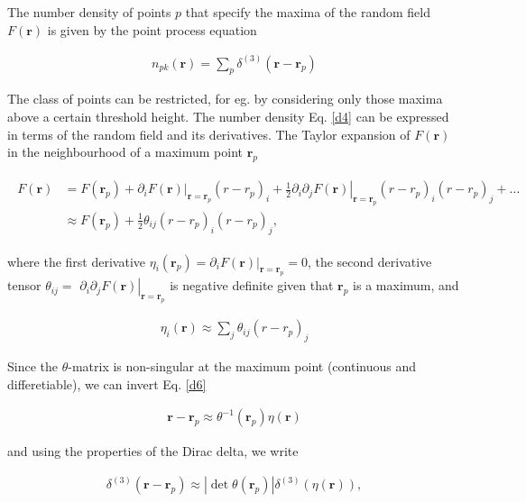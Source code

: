 \begin{appendices}
The number density of points $p$ that specify the maxima of the random field $F(\mathbf{r})$ is given by the point process equation

\begin{align}
    n_{p k}(\mathbf{r})=\sum_{p} \delta^{(3)}\left(\mathbf{r}-\mathbf{r}_{p}\right) \label{d4}
\end{align}

The class of points can be restricted, for eg. by considering only those maxima above a certain threshold height. The number density Eq. \ref{d4} can be expressed in terms of the random field and its derivatives. The Taylor expansion of $F(\mathbf{r})$ in the neighbourhood of a maximum point $\mathbf{r}_{p}$

\begin{align}\begin{split}
    F(\mathbf{r}) & =F\left(\mathbf{r}_{p}\right)+\left.\partial_{i} F(\mathbf{r})\right|_{\mathbf{r}=\mathbf{r}_{p}}\left(r-r_{p}\right)_{i}+\left.\frac{1}{2} \partial_{i} \partial_{j} F(\mathbf{r})\right|_{\mathbf{r}=\mathbf{r}_{p}}\left(r-r_{p}\right)_{i}\left(r-r_{p}\right)_{j}+\ldots \\
    & \approx F\left(\mathbf{r}_{p}\right)+\frac{1}{2} \theta_{i j}\left(r-r_{p}\right)_{i}\left(r-r_{p}\right)_{j},\end{split}\label{d5}
\end{align}

where the first derivative $\eta_{i}\left(\mathbf{r}_{p}\right)=\left.\partial_{i} F(\mathbf{r})\right|_{\mathbf{r}=\mathbf{r}_{p}}=0$, the second derivative tensor $\theta_{i j}=$ $\left.\partial_{i} \partial_{j} F(\mathbf{r})\right|_{\mathbf{r}=\mathbf{r}_{p}}$ is negative definite given that $\mathbf{r}_{p}$ is a maximum, and

\begin{align}
    \eta_{i}(\mathbf{r}) \approx \sum_{j} \theta_{i j}\left(r-r_{p}\right)_{j} \label{d6}
\end{align}

Since the $\theta$-matrix is non-singular at the maximum point (continuous and differetiable), we can invert Eq. \ref{d6}

\begin{align}
    \mathbf{r}-\mathbf{r}_{p} \approx \theta^{-1}\left(\mathbf{r}_{p}\right) \eta(\mathbf{r}) \label{d7}
\end{align}

and using the properties of the Dirac delta, we write

\begin{align}
    \delta^{(3)}\left(\mathbf{r}-\mathbf{r}_{p}\right) \approx\left|\operatorname{det} \theta\left(\mathbf{r}_{p}\right)\right| \delta^{(3)}(\eta(\mathbf{r})), \label{d8}
\end{align}


\end{appendices}

